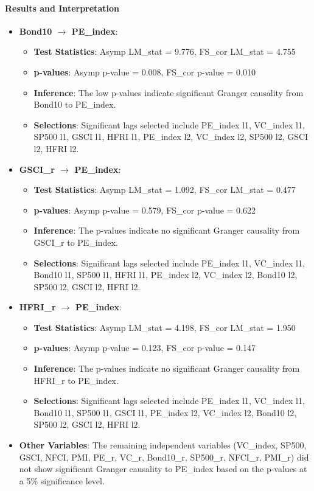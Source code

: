 \documentclass[11pt]{article}
\begin{document}
\paragraph{Results and Interpretation}
\begin{itemize}
    \item \textbf{Bond10 $\rightarrow$ PE\_index}: 
        \begin{itemize}
            \item \textbf{Test Statistics}: Asymp LM\_stat = 9.776, FS\_cor LM\_stat = 4.755
            \item \textbf{p-values}: Asymp p-value = 0.008, FS\_cor p-value = 0.010
            \item \textbf{Inference}: The low p-values indicate significant Granger causality from Bond10 to PE\_index.
            \item \textbf{Selections}: Significant lags selected include PE\_index l1, VC\_index l1, SP500 l1, GSCI l1, HFRI l1, PE\_index l2, VC\_index l2, SP500 l2, GSCI l2, HFRI l2.
        \end{itemize}
    \item \textbf{GSCI\_r $\rightarrow$ PE\_index}: 
        \begin{itemize}
            \item \textbf{Test Statistics}: Asymp LM\_stat = 1.092, FS\_cor LM\_stat = 0.477
            \item \textbf{p-values}: Asymp p-value = 0.579, FS\_cor p-value = 0.622
            \item \textbf{Inference}: The p-values indicate no significant Granger causality from GSCI\_r to PE\_index.
            \item \textbf{Selections}: Significant lags selected include PE\_index l1, VC\_index l1, Bond10 l1, SP500 l1, HFRI l1, PE\_index l2, VC\_index l2, Bond10 l2, SP500 l2, GSCI l2, HFRI l2.
        \end{itemize}
    \item \textbf{HFRI\_r $\rightarrow$ PE\_index}: 
        \begin{itemize}
            \item \textbf{Test Statistics}: Asymp LM\_stat = 4.198, FS\_cor LM\_stat = 1.950
            \item \textbf{p-values}: Asymp p-value = 0.123, FS\_cor p-value = 0.147
            \item \textbf{Inference}: The p-values indicate no significant Granger causality from HFRI\_r to PE\_index.
            \item \textbf{Selections}: Significant lags selected include PE\_index l1, VC\_index l1, Bond10 l1, SP500 l1, GSCI l1, PE\_index l2, VC\_index l2, Bond10 l2, SP500 l2, GSCI l2, HFRI l2.
        \end{itemize}
    \item \textbf{Other Variables}: The remaining independent variables (VC\_index, SP500, GSCI, NFCI, PMI, PE\_r, VC\_r, Bond10\_r, SP500\_r, NFCI\_r, PMI\_r) did not show significant Granger causality to PE\_index based on the p-values at a 5\% significance level.
\end{itemize}
\end{document}
